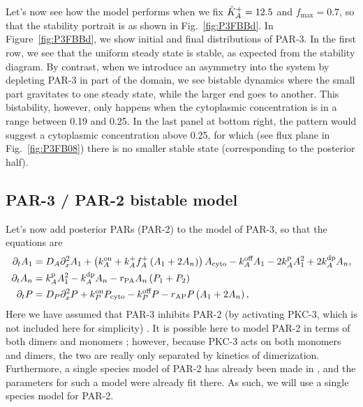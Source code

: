 \documentclass[11pt]{article}
\newcommand{\6}[1]{#1_{\text{6}}}
\newcommand{\3}[1]{#1_{\text{3}}}
\newcommand{\A}[1]{#1_A}
\begin{document}
Let's now see how the model performs when we fix $\hat{K}^\text{+}_A=12.5$ and $f_\text{max}=0.7$, so that the stability portrait is as shown in Fig.\ \ref{fig:P3FBBd}. In Figure\ \ref{fig:P3FBBd}, we show initial and final distributions of PAR-3. In the first row, we see that the uniform steady state is stable, as expected from the stability diagram. By contrast, when we introduce an asymmetry into the system by depleting PAR-3 in part of the domain, we see bistable dynamics where the small part gravitates to one steady state, while the larger end goes to another. This bistability, however, only happens when the cytoplasmic concentration is in a range between 0.19 and 0.25. In the last panel at bottom right, the pattern would suggest a cytoplasmic concentration above 0.25, for which (see flux plane in Fig.\ \ref{fig:P3FB08}) there is no smaller stable state (corresponding to the posterior half).


\subsection{PAR-3 / PAR-2 bistable model \label{sec:P2P3}}
Let's now add posterior PARs (PAR-2) to the model of PAR-3, so that the equations are 
\begin{subequations}
\label{eq:P32}
\begin{align}
\Dt A_1 &= D_A \Dx^2 A_1 +\left( \kon_A +\A{\kf}\A{f}^+\left(\MA+2\PA\right)\right) A_\text{cyto} - \koff_A \MA -2\kp_A \MA^2+2\kdp_A \PA,\\
\Dt \PA &= \kp_A \MA^2 - \kdp_A \PA-r_\text{PA} \PA\left(P_1+P_2\right)\\
\Dt P &= D_P \Dx^2 P + \kon_P P_\text{cyto} - \koff_P P -r_\text{AP} P\left(\MA+2\PA\right),%
\end{align}
\end{subequations}
Here we have assumed that PAR-3 inhibits PAR-2 (by activating PKC-3, which is not included here for simplicity) \cite{lang2017proteins}. It is possible here to model PAR-2 in terms of both dimers and monomers \cite{bland2023optimized}; however, because PKC-3 acts on both monomers and dimers, the two are really only separated by kinetics of dimerization. Furthermore, a single species model of PAR-2 has already been made in \cite{gross2019guiding}, and the parameters for such a model were already fit there. As such, we will use a single species model for PAR-2. 
\end{document}

